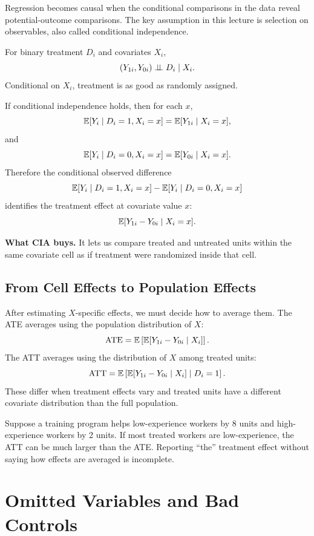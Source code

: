 Regression becomes causal when the conditional comparisons in the data reveal
potential-outcome comparisons. The key assumption in this lecture is selection
on observables, also called conditional independence.

\begin{assN}
For binary treatment \(D_i\) and covariates \(X_i\),
\[
    (Y_{1i},Y_{0i}) \perp\!\!\!\perp D_i \mid X_i.
\]
Conditional on \(X_i\), treatment is as good as randomly assigned.
\end{assN}

If conditional independence holds, then for each \(x\),
\[
    \mathbb{E}[Y_i\mid D_i=1,X_i=x]=\mathbb{E}[Y_{1i}\mid X_i=x],
\]
and
\[
    \mathbb{E}[Y_i\mid D_i=0,X_i=x]=\mathbb{E}[Y_{0i}\mid X_i=x].
\]
Therefore the conditional observed difference
\[
    \mathbb{E}[Y_i\mid D_i=1,X_i=x]-\mathbb{E}[Y_i\mid D_i=0,X_i=x]
\]
identifies the treatment effect at covariate value \(x\):
\[
    \mathbb{E}[Y_{1i}-Y_{0i}\mid X_i=x].
\]

\begin{boxD}
\textbf{What CIA buys.} It lets us compare treated and untreated units within
the same covariate cell as if treatment were randomized inside that cell.
\end{boxD}

\subsection{From Cell Effects to Population Effects}

After estimating \(X\)-specific effects, we must decide how to average them.
The ATE averages using the population distribution of \(X\):
\[
    \mathrm{ATE} = \mathbb{E}\left[\mathbb{E}[Y_{1i}-Y_{0i}\mid X_i]\right].
\]
The ATT averages using the distribution of \(X\) among treated units:
\[
    \mathrm{ATT} = \mathbb{E}\left[\mathbb{E}[Y_{1i}-Y_{0i}\mid X_i]\mid D_i=1\right].
\]
These differ when treatment effects vary and treated units have a different
covariate distribution than the full population.

\begin{exmp}
Suppose a training program helps low-experience workers by 8 units and
high-experience workers by 2 units. If most treated workers are low-experience,
the ATT can be much larger than the ATE. Reporting ``the'' treatment effect
without saying how effects are averaged is incomplete.
\end{exmp}

\section{Omitted Variables and Bad Controls}

